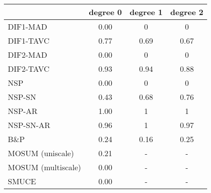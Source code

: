 \begin{tabular}{|l|c|c|c|}
  \hline
 & degree 0 & degree 1 & degree 2 \\ 
  \hline
DIF1-MAD & 0.00 & 0 & 0 \\ 
  DIF1-TAVC & 0.77 & 0.69 & 0.67 \\ 
  DIF2-MAD & 0.00 & 0 & 0 \\ 
  DIF2-TAVC & 0.93 & 0.94 & 0.88 \\ 
  NSP & 0.00 & 0 & 0 \\ 
  NSP-SN & 0.43 & 0.68 & 0.76 \\ 
  NSP-AR & 1.00 & 1 & 1 \\ 
  NSP-SN-AR & 0.96 & 1 & 0.97 \\ 
  B\&P & 0.24 & 0.16 & 0.25 \\ 
  MOSUM (uniscale) & 0.21 & - & - \\ 
  MOSUM (multiscale) & 0.00 & - & - \\ 
  SMUCE & 0.00 & - & - \\ 
   \hline
\end{tabular}
